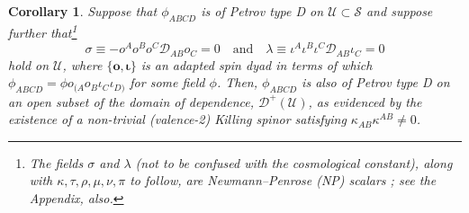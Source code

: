 \documentclass[10pt,a4paper]{article}
\theoremstyle{plain}
\newtheorem{corollary}{Corollary}
\def\bmo{{\bm o}}
\newcounter{mnotecount}%
\newcommand{\mnotex}[1]%
{\protect{\stepcounter{mnotecount}}$^{\mbox{\footnotesize $\bullet$\themnotecount}}$ 
\marginpar{%
\raggedright\tiny\em
$\!\!\!\!\!\!\,\bullet$\themnotecount: #1} }
\begin{document}
\begin{corollary}\label{Corollary:PetrovPropagation}
Suppose that $\phi_{ABCD}$ is of Petrov type D on $\mathcal{U}\subset\mathcal{S}$ and suppose further that\footnote{The fields $\sigma$ and $\lambda$ (not to be confused with the cosmological constant), along with $\kappa, \tau, \rho, \mu, \nu, \pi$ to follow, are Newmann--Penrose (NP) scalars \cite{PenRin84, PenRin86}; see the Appendix, also.}
\begin{equation} 
\sigma\equiv - o^A o^B o^C\mathcal{D}_{AB}o_C=0 \quad \text{and}\quad \lambda\equiv \iota^A\iota^B\iota^C\mathcal{D}_{AB}\iota_C=0\label{ShearConditions}
\end{equation}
hold on $\mathcal{U}$, where $\lbrace \bmo, \bm\iota\rbrace$ is an adapted spin dyad in terms of which $\phi_{ABCD}=\phi o_{(A}o_B\iota_C\iota_{D)}$ for some field $\phi$.
Then, $\phi_{ABCD}$ is also of Petrov type D on an open subset of the domain of dependence, $\mathcal{D}^+(\mathcal{U})$, as evidenced by the existence of a non-trivial (valence-2) Killing spinor satisfying $\kappa_{AB}\kappa^{AB}\neq 0$. 
\end{corollary}
\end{document}
